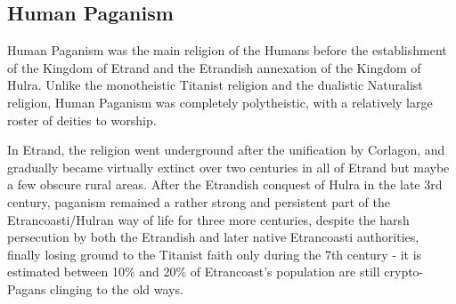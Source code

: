 \subsection{Human Paganism}


Human Paganism was the main religion of the Humans before the establishment of the Kingdom of Etrand and the Etrandish annexation of the Kingdom of Hulra. Unlike the monotheistic Titanist religion and the dualistic Naturalist religion, Human Paganism was completely polytheistic, with a relatively large roster of deities to worship.

In Etrand, the religion went underground after the unification by Corlagon, and gradually became virtually extinct over two centuries in all of Etrand but maybe a few obscure rural areas. After the Etrandish conquest of Hulra in the late 3rd century, paganism remained a rather strong and persistent part of the Etrancoasti/Hulran way of life for three more centuries, despite the harsh persecution by both the Etrandish and later native Etrancoasti authorities, finally losing ground to the Titanist faith only during the 7th century - it is estimated between 10\% and 20\% of Etrancoast's population are still crypto-Pagans clinging to the old ways. 
